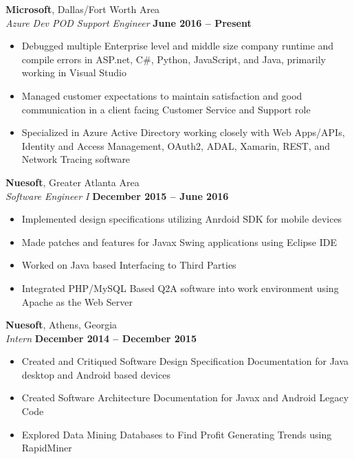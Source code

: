 \documentclass[margin,line]{resume}
\begin{document}
\begin{resume}
\begin{list2}
	\textbf{Microsoft}, Dallas/Fort Worth Area \vspace{1mm}\\\vspace{1mm}%
	\textsl{Azure Dev POD Support Engineer} \hfill \textbf{June 2016 -- Present}
	\begin{itemize}
	 	\item Debugged multiple Enterprise level and middle size company runtime and compile errors in ASP.net, C\#, Python, JavaScript, and Java, primarily working in Visual Studio
	 	\item Managed customer expectations to maintain satisfaction and good communication in a client facing Customer Service and Support role
	 	\item Specialized in Azure Active Directory working closely with Web Apps/APIs, Identity and Access Management, OAuth2, ADAL, Xamarin, REST, and Network Tracing software
	\end{itemize}
	\textbf{Nuesoft}, Greater Atlanta Area \vspace{1mm}\\\vspace{1mm}%
	\textsl{Software Engineer I} \hfill \textbf{December 2015 -- June 2016}
	\begin{itemize}
	 	\item Implemented design specifications utilizing Anrdoid SDK for mobile devices
	 	\item Made patches and features for Javax Swing applications using Eclipse IDE
	 	\item Worked on Java based Interfacing to Third Parties 
	 	\item Integrated PHP/MySQL Based Q2A software into work environment using Apache as the Web Server
	\end{itemize}
	
	\textbf{Nuesoft}, Athens, Georgia \vspace{1mm}\\\vspace{1mm}%
	\textsl{Intern} \hfill \textbf{December 2014 -- December 2015}
	\begin{itemize}
	  	\item Created and Critiqued Software Design Specification Documentation for Java desktop and Android based devices
	  	\item Created Software Architecture Documentation for Javax and Android Legacy Code
	  	\item Explored Data Mining Databases to Find Profit Generating Trends using RapidMiner
	\end{itemize}


\end{list2}
\end{resume}
\end{document}
